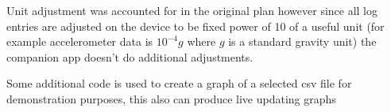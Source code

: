Unit adjustment was accounted for in the original plan however since all log entries are adjusted on the device to be fixed power of 10 of a useful unit (for example accelerometer data is $10^{-4} g$ where $g$ is a standard gravity unit) the companion app doesn't do additional adjustments. 

Some additional code is used to create a graph of a selected csv file for demonstration purposes, this also can produce live updating graphs

